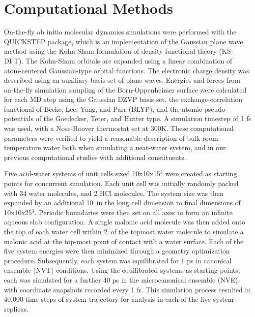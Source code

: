 \section {Computational Methods}

On-the-fly ab initio molecular dynamics simulations were performed with the QUICKSTEP package, which is an implementation of the Gaussian plane wave method using the Kohn-Sham formulation of density functional theory (KS-DFT).\cite{VandeVondele2005} The Kohn-Sham orbitals are expanded using a linear combination of atom-centered Gaussian-type orbital functions. The electronic charge density was described using an auxiliary basis set of plane waves. Energies and forces from on-the-fly simulation sampling of the Born-Oppenheimer surface were calculated for each MD step using the Gaussian DZVP basis set, the exchange-correlation functional of Becke, Lee, Yang, and Parr (BLYP),\cite{Lee1988} and the atomic pseudo-potentials of the Goedecker, Teter, and Hutter type.\cite{Goedecker1996} A simulation timestep of 1 fs was used, with a Nose-Hoover thermostat set at 300K. These computational parameters were verified to yield a reasonable description of bulk room temperature water both when simulating a neat-water system, and in our previous computational studies with additional constituents.\cite{Shamay2007}

Five acid-water systems of unit cells sized 10x10x15\angs$^3$ were created as starting points for concurrent simulation.  Each unit cell was initially randomly packed with 34 water molecules, and 2 HCl molecules.  The system size was then expanded by an additional 10\angs~in the long cell dimension to final dimensions of 10x10x25\angs$^3$.  Periodic boundaries were then set on all axes to form an infinite aqueous slab configuration.  A single malonic acid molecule was then added onto the top of each water cell within 2\angs~of the topmost water molecule to simulate a malonic acid at the top-most point of contact with a water surface. Each of the five system energies were then minimized through a geometry optimization procedure.  Subsequently, each system was equilibrated for 1 ps in canonical ensemble (NVT) conditions.  Using the equilibrated systems as starting points, each was simulated for a further 40 ps in the microcanonical ensemble (NVE), with coordinate snapshots recorded every 1 fs.  This simulation process resulted in 40,000 time steps of system trajectory for analysis in each of the five system replicas.
